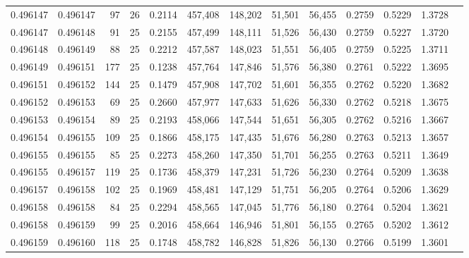 \begin{tabular}{rrrrrrrrrrrrr}
0.496147 & 0.496147 &    97 &  26 &                                     0.2114 & 457,408 & 148,202 &  51,501 &  56,455 & 0.2759 & 0.5229 & 1.3728 \\
0.496147 & 0.496148 &    91 &  25 &                                     0.2155 & 457,499 & 148,111 &  51,526 &  56,430 & 0.2759 & 0.5227 & 1.3720 \\
0.496148 & 0.496149 &    88 &  25 &                                     0.2212 & 457,587 & 148,023 &  51,551 &  56,405 & 0.2759 & 0.5225 & 1.3711 \\
0.496149 & 0.496151 &   177 &  25 &                                     0.1238 & 457,764 & 147,846 &  51,576 &  56,380 & 0.2761 & 0.5222 & 1.3695 \\
0.496151 & 0.496152 &   144 &  25 &                                     0.1479 & 457,908 & 147,702 &  51,601 &  56,355 & 0.2762 & 0.5220 & 1.3682 \\
0.496152 & 0.496153 &    69 &  25 &                                     0.2660 & 457,977 & 147,633 &  51,626 &  56,330 & 0.2762 & 0.5218 & 1.3675 \\
0.496153 & 0.496154 &    89 &  25 &                                     0.2193 & 458,066 & 147,544 &  51,651 &  56,305 & 0.2762 & 0.5216 & 1.3667 \\
0.496154 & 0.496155 &   109 &  25 &                                     0.1866 & 458,175 & 147,435 &  51,676 &  56,280 & 0.2763 & 0.5213 & 1.3657 \\
0.496155 & 0.496155 &    85 &  25 &                                     0.2273 & 458,260 & 147,350 &  51,701 &  56,255 & 0.2763 & 0.5211 & 1.3649 \\
0.496155 & 0.496157 &   119 &  25 &                                     0.1736 & 458,379 & 147,231 &  51,726 &  56,230 & 0.2764 & 0.5209 & 1.3638 \\
0.496157 & 0.496158 &   102 &  25 &                                     0.1969 & 458,481 & 147,129 &  51,751 &  56,205 & 0.2764 & 0.5206 & 1.3629 \\
0.496158 & 0.496158 &    84 &  25 &                                     0.2294 & 458,565 & 147,045 &  51,776 &  56,180 & 0.2764 & 0.5204 & 1.3621 \\
0.496158 & 0.496159 &    99 &  25 &                                     0.2016 & 458,664 & 146,946 &  51,801 &  56,155 & 0.2765 & 0.5202 & 1.3612 \\
0.496159 & 0.496160 &   118 &  25 &                                     0.1748 & 458,782 & 146,828 &  51,826 &  56,130 & 0.2766 & 0.5199 & 1.3601 \\

\end{tabular}
